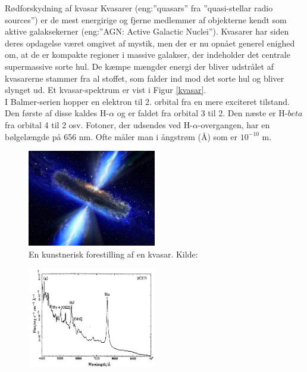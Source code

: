 \begin{opgave}{Rødforskydning af kvasar}%
	Kvasarer (eng:”quasars” fra ”quasi-stellar radio sources”) er de mest energirige og
	fjerne medlemmer af objekterne kendt som aktive galaksekerner (eng:”AGN: Active
	Galactic Nuclei”). Kvasarer har siden deres opdagelse været omgivet af mystik, men
	der er nu opnået generel enighed om, at de er kompakte regioner i massive galakser,
	der indeholder det centrale supermassive sorte hul. De kæmpe mængder energi der
	bliver udstrålet af kvasarerne stammer fra al stoffet, som falder ind mod det sorte
	hul og bliver slynget ud.
	Et kvasar-spektrum er vist i Figur \ref{kvasar}.
	\\
	I Balmer-serien hopper en elektron til 2. orbital fra en mere exciteret tilstand. Den første af disse kaldes H-$\alpha$ og er faldet fra orbital 3 til 2. Den næste er H-$beta$ fra orbital 4 til 2 osv. Fotoner, der udsendes ved H-$\alpha$-overgangen, har en bølgelængde på 656 nm. Ofte måler man i ångstrøm (Å) som er $10^{-10}$ m.\\
		\begin{figure}[h!]
			\centering
			\includegraphics[width=0.5\textwidth]{opg/figurer/kvasarkunst.jpg}
			\caption{En kunstnerisk forestilling af en kvasar. Kilde: \cite{NASA_ESA_quasar}} %
			\label{kvasarkunst}
		\end{figure}
	\begin{figure}[h!]
		\centering
		\includegraphics[width=0.5\textwidth]{opg/figurer/kvasar.png}

\end{figure}
\end{opgave}
